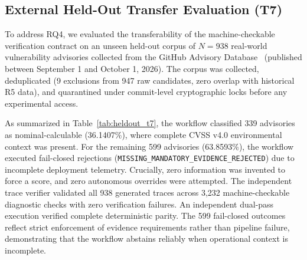 \documentclass[conference]{IEEEtran}
\begin{document}
\subsection{External Held-Out Transfer Evaluation (T7)}
\label{sec:r6_t7}
To address RQ4, we evaluated the transferability of the machine-checkable verification contract on an unseen held-out corpus of $N=938$ real-world vulnerability advisories collected from the GitHub Advisory Database~\cite{gh_advisory_database} (published between September 1 and October 1, 2026). The corpus was collected, deduplicated (9 exclusions from 947 raw candidates, zero overlap with historical R5 data), and quarantined under commit-level cryptographic locks before any experimental access.

\begin{table}[t]
\caption{Held-Out Transfer Evaluation Results on Unseen Advisories ($N=938$)}
\label{tab:heldout_t7}
\centering
\small
{}
\end{table}

As summarized in Table~\ref{tab:heldout_t7}, the workflow classified 339 advisories as nominal-calculable (36.1407\%), where complete CVSS v4.0 environmental context was present. For the remaining 599 advisories (63.8593\%), the workflow executed fail-closed rejections (\texttt{MISSING\_MANDATORY\_EVIDENCE\_REJECTED}) due to incomplete deployment telemetry. Crucially, zero information was invented to force a score, and zero autonomous overrides were attempted. The independent trace verifier validated all 938 generated traces across 3,232 machine-checkable diagnostic checks with zero verification failures. An independent dual-pass execution verified complete deterministic parity. The 599 fail-closed outcomes reflect strict enforcement of evidence requirements rather than pipeline failure, demonstrating that the workflow abstains reliably when operational context is incomplete.
\end{document}

